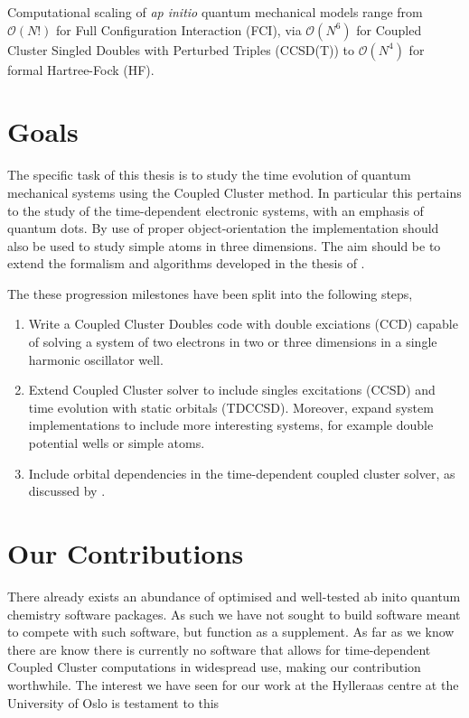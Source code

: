     Computational scaling of \emph{ap initio} quantum mechanical models range from 
    $\mathcal{O}(N!)$ for Full Configuration Interaction (FCI), via $\mathcal{O}(N^6)$ 
    for Coupled Cluster Singled Doubles with Perturbed Triples (CCSD(T)) to 
    $\mathcal{O}(N^4)$ for formal Hartree-Fock (HF)\cite{ratcliff2017challenges}.


\section{Goals}

    The specific task of this thesis is to study the time evolution of quantum 
    mechanical systems using the Coupled Cluster method. In particular this 
    pertains to the study of the time-dependent electronic systems, with an emphasis 
    of quantum dots. By use of proper object-orientation the implementation should 
    also be used to study simple atoms in three dimensions. The aim should be to 
    extend the formalism and algorithms developed in the thesis of 
    \citeauthor{haakon2017time}\citeauthor{haakon2017time}.

    The these progression milestones have been split into the following steps,

    \begin{enumerate}
        \item Write a Coupled Cluster Doubles code with double exciations (CCD)
            capable of solving a system of two electrons in two or three dimensions 
            in a single harmonic oscillator well.
        \item Extend Coupled Cluster solver to include singles excitations (CCSD)
            and time evolution with static orbitals (TDCCSD). Moreover, expand system
            implementations to include more interesting systems, for example double
            potential wells or simple atoms.
        \item Include orbital dependencies in the time-dependent coupled cluster solver, as 
            discussed by \citeauthor{kvaal2012ab}\cite{kvaal2012ab}.
    \end{enumerate}

\section{Our Contributions}

    There already exists an abundance of optimised and well-tested ab inito quantum chemistry 
    software packages. As such we have not sought to build software meant to compete 
    with such software, but function as a supplement. As far as we know there are know 
    there is currently no software that allows for time-dependent Coupled Cluster 
    computations in widespread use, making our contribution worthwhile. The interest 
    we have seen for our work at the Hylleraas centre at the University of Oslo 
    is testament to this

